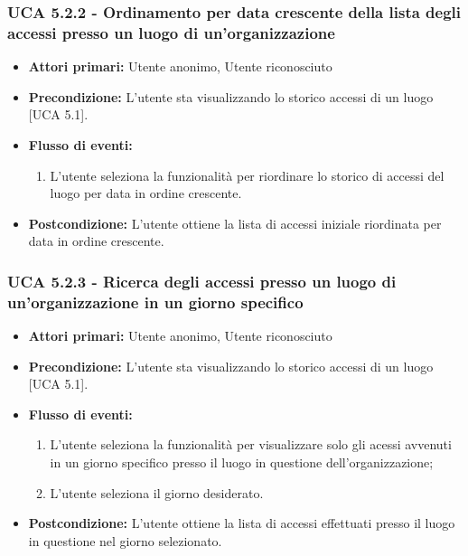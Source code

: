 \subsubsection{UCA 5.2.2 - Ordinamento per data crescente della lista degli accessi presso un luogo di un'organizzazione}
\begin{itemize}
    \item \textbf{Attori primari:} Utente anonimo, Utente riconosciuto
    \item \textbf{Precondizione:} L'utente sta visualizzando lo storico accessi di un luogo [UCA 5.1].
    \item \textbf{Flusso di eventi:}
    \begin{enumerate}
        \item L'utente seleziona la funzionalità per riordinare lo storico di accessi del luogo per data in ordine crescente.
    \end{enumerate}
    \item \textbf{Postcondizione:} L'utente ottiene la lista di accessi iniziale riordinata per data in ordine crescente.
\end{itemize}

\subsubsection{UCA 5.2.3 - Ricerca degli accessi presso un luogo di un'organizzazione in un giorno specifico}
\begin{itemize}
    \item \textbf{Attori primari:} Utente anonimo, Utente riconosciuto
    \item \textbf{Precondizione:} L'utente sta visualizzando lo storico accessi di un luogo [UCA 5.1].
    \item \textbf{Flusso di eventi:}
    \begin{enumerate}
        \item L'utente seleziona la funzionalità per visualizzare solo gli acessi avvenuti in un giorno specifico presso il luogo in questione dell'organizzazione;
        \item L'utente seleziona il giorno desiderato.
    \end{enumerate}
    \item \textbf{Postcondizione:} L'utente ottiene la lista di accessi effettuati presso il luogo in questione nel giorno selezionato.
\end{itemize}

